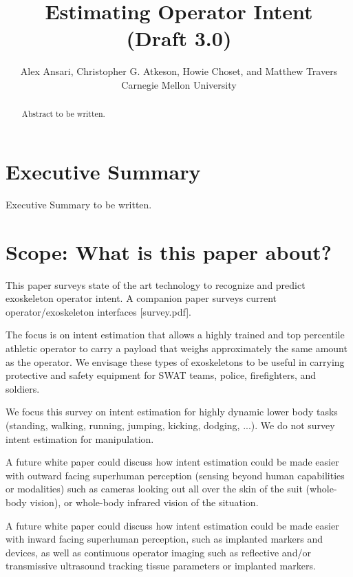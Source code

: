\documentclass[letterpaper,12pt,fullpage]{article}
\begin{document}
\title{Estimating Operator Intent\\
(Draft 3.0)}

\author{Alex Ansari, Christopher G. Atkeson, Howie Choset, and Matthew Travers\\
Carnegie Mellon University}

\maketitle

\begin{abstract}
Abstract to be written.
\end{abstract}

\section{Executive Summary}

Executive Summary to be written.

\section{Scope: What is this paper about?}

This paper surveys state of the art technology to recognize
and predict exoskeleton
operator intent.
A companion paper surveys current operator/exoskeleton interfaces [survey.pdf].

The focus is on intent estimation that allows a
highly trained and top percentile athletic 
operator to carry a payload that weighs approximately the same amount
as the operator. We envisage these types of exoskeletons to be useful
in carrying protective and safety equipment for SWAT teams, police,
firefighters, and soldiers. 

We focus this survey on intent estimation for highly dynamic 
lower body tasks (standing, walking,
running, jumping, kicking, dodging, ...).
We do not survey intent estimation for manipulation. 

A future white paper could discuss how intent estimation could be 
made easier with outward facing
superhuman perception (sensing beyond human capabilities
or modalities) such as cameras looking out all over the skin
of the suit (whole-body vision), or whole-body 
infrared vision of the situation.

A future white paper could discuss how intent estimation could be 
made easier with inward facing superhuman perception,
such as implanted markers and devices, as well as continuous
operator imaging such as reflective and/or transmissive ultrasound
tracking tissue parameters or implanted markers.
\end{document}
